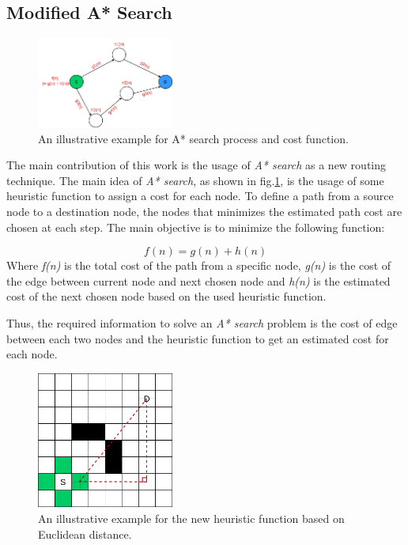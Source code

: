 \subsection{Modified A* Search}
\begin{figure}[H]
    \centering
    \includegraphics[width=0.4\textwidth]{figures/a_star.png}
    \caption{An illustrative example for A* search process and cost function.}
    \label{fig:astar}
\end{figure}

The main contribution of this work is the usage of \emph{A* search} as a new routing technique. The main idea of \emph{A* search}, as shown in fig.\ref{fig:astar}, is the usage of some heuristic function to assign a cost for each node. To define a path from a source node to a destination node, the nodes that minimizes the estimated path cost are chosen at each step. The main objective is to minimize the following function:

\begin{equation} \label{eq:astar}
f(n) = g(n) + h(n)
\end{equation}
Where \emph{f(n)} is the total cost of the path from a specific node, \emph{g(n)} is the cost of the edge between current node and next chosen node and \emph{h(n)} is the estimated cost of the next chosen node based on the used heuristic function.

Thus, the required information to solve an \emph{A* search} problem is the cost of edge between each two nodes and the heuristic function to get an estimated cost for each node.

\begin{figure}[H]
    \centering
    \includegraphics[width=0.4\textwidth]{figures/grid_euclid.png}
    \caption{An illustrative example for the new heuristic function based on Euclidean distance.}
    \label{fig:euclid}
\end{figure}

